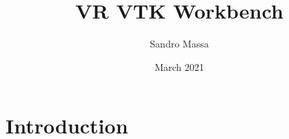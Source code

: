 \documentclass{article}
\title{VR VTK Workbench}
\author{Sandro Massa}
\date{March 2021}
\begin{document}
\maketitle

\section{Introduction}
\end{document}
